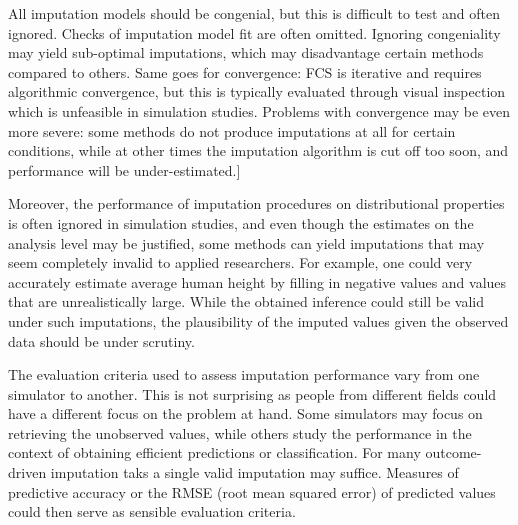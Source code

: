 \documentclass[bimj,fleqn]{w-art}
\begin{document}
All imputation models should be congenial, but this is difficult to test and often ignored. Checks of imputation model fit are often omitted. Ignoring congeniality may yield sub-optimal imputations, which may disadvantage certain methods compared to others. Same goes for convergence: FCS is iterative and requires algorithmic convergence, but this is typically evaluated through visual inspection which is unfeasible in simulation studies. Problems with convergence may be even more severe: some methods do not produce imputations at all for certain conditions, while at other times the imputation algorithm is cut off too soon, and performance will be under-estimated.]  

Moreover, the performance of imputation procedures on distributional properties is often ignored in simulation studies, and even though the estimates on the analysis level may be justified, some methods can yield imputations that may seem completely invalid to applied researchers. For example, one could very accurately estimate average human height by filling in negative values and values that are unrealistically large. While the obtained inference could still be valid under such imputations, the plausibility of the imputed values given the observed data should be under scrutiny. 

The evaluation criteria used to assess imputation performance vary from one simulator to another. This is not surprising as people from different fields could have a different focus on the problem at hand. Some simulators may focus on retrieving the unobserved values, while others study the performance in the context of obtaining efficient predictions or classification. For many outcome-driven imputation taks a single valid imputation may suffice. Measures of predictive accuracy or the RMSE (root mean squared error) of predicted values could then serve as sensible evaluation criteria.

\end{document}
